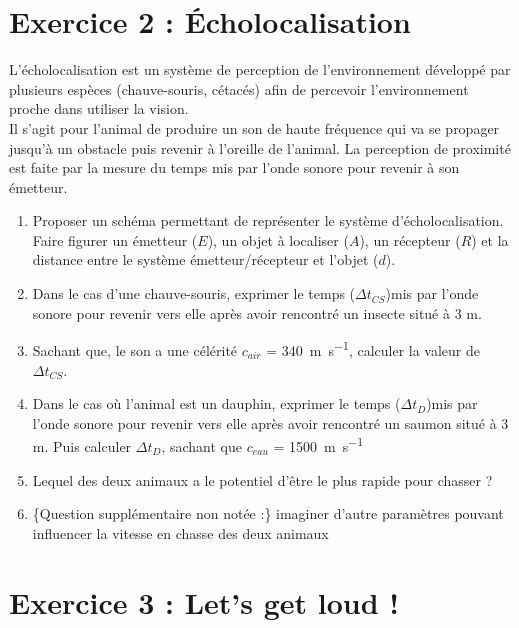 \documentclass[a4paper,12pt]{article}
\begin{document}
\section*{Exercice 2 : Écholocalisation}
L'écholocalisation est un système de perception de l'environnement développé par plusieurs espèces (chauve-souris, cétacés) afin de percevoir l'environnement proche dans utiliser la vision.\\
Il s'agit pour l'animal de produire un son de haute fréquence qui va se propager jusqu'à un obstacle puis revenir à l'oreille de l'animal. La perception de proximité est faite par la mesure du temps mis par l'onde sonore pour revenir à son émetteur.
\begin{enumerate}
	\item Proposer un schéma permettant de représenter le système d'écholocalisation. Faire figurer un émetteur ($E$), un objet à localiser ($A$), un récepteur ($R$) et la distance entre le système émetteur/récepteur et l'objet ($d$).
	\item Dans le cas d'une chauve-souris, exprimer le temps ($\Delta t_{CS}$)mis par l'onde sonore pour revenir vers elle après avoir rencontré un insecte situé à 3 m.
	\item Sachant que, le son a une célérité $c_{air}$ = \SI{340}{\meter\per\second}, calculer la valeur de $\Delta t_{CS}$.
	\item Dans le cas où l'animal est un dauphin, exprimer le temps ($\Delta t_{D}$)mis par l'onde sonore pour revenir vers elle après avoir rencontré un saumon situé à 3 m. Puis calculer $\Delta t_{D}$, sachant que $c_{eau}$ = \SI{1500}{\meter\per\second}
	\item Lequel des deux animaux a le potentiel d'être le plus rapide pour chasser ?
	\item \{Question supplémentaire non notée :\} imaginer d'autre paramètres pouvant influencer la vitesse en chasse des deux animaux
\end{enumerate}

\section*{Exercice 3 : Let's get loud !}
\end{document}
